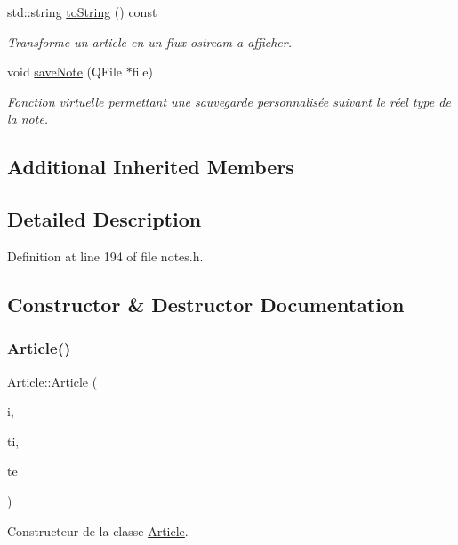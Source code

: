 \begin{DoxyCompactItemize}
std\+::string \hyperlink{class_article_ae40d268ecffbaaa549968a81ea609ba4}{to\+String} () const
\begin{DoxyCompactList}\small\item\em Transforme un article en un flux ostream a afficher. \end{DoxyCompactList}\item 
void \hyperlink{class_article_a83c6688e4886b871938b9dca34e78041}{save\+Note} (Q\+File $\ast$file)
\begin{DoxyCompactList}\small\item\em Fonction virtuelle permettant une sauvegarde personnalisée suivant le réel type de la note. \end{DoxyCompactList}\end{DoxyCompactItemize}
\subsection*{Additional Inherited Members}


\subsection{Detailed Description}


Definition at line 194 of file notes.\+h.



\subsection{Constructor \& Destructor Documentation}
\mbox{\label{class_article_af3f6b98ba3cc46aaa5625a17266eb67f}} 
\subsubsection{\texorpdfstring{Article()}{Article()}}
{\footnotesize\ttfamily Article\+::\+Article (\begin{DoxyParamCaption}\item[{const Q\+String \&}]{i,  }\item[{const Q\+String \&}]{ti,  }\item[{const Q\+String \&}]{te }\end{DoxyParamCaption})}



Constructeur de la classe \hyperlink{class_article}{Article}. 


